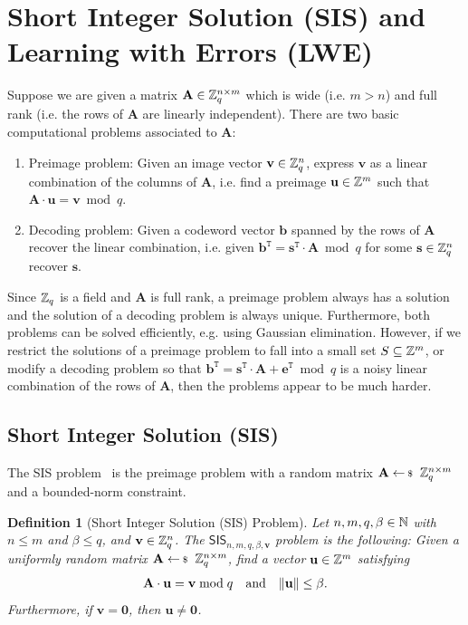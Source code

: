\documentclass[10pt,twoside]{article}
\newtheorem{definition}[theorem]{Definition}
\renewcommand{\vec}[1]{\mathbf{#1}}
\newcommand{\mat}[1]{\mathbf{#1}}
\newcommand{\transpose}{\mathtt{T}}
\newcommand{\SIS}{\mathsf{SIS}}
\begin{document}
\section{Short Integer Solution (SIS) and Learning with Errors (LWE)}

Suppose we are given a matrix $\mat{A} \in \ZZ_q^{n \times m}$ which is wide (i.e. $m > n$) and full rank (i.e. the rows of $\mat{A}$ are linearly independent).
There are two basic computational problems associated to $\mat{A}$:
\begin{enumerate}
    \item Preimage problem: Given an image vector $\vec{v} \in \ZZ_q^n$, express $\vec{v}$ as a linear combination of the columns of $\mat{A}$, i.e. find a preimage $\vec{u} \in \ZZ^m$ such that $\mat{A} \cdot \vec{u} = \vec{v} \bmod q$.
    \item Decoding problem: Given a codeword vector $\vec{b}$ spanned by the rows of $\mat{A}$ recover the linear combination, i.e. given $\vec{b}^\transpose = \vec{s}^\transpose \cdot \mat{A} \bmod q$ for some $\vec{s} \in \ZZ_q^n$ recover $\vec{s}$.
\end{enumerate}
Since $\mathbb{Z}_q$ is a field and $\mat{A}$ is full rank, a preimage problem always has a solution and the solution of a decoding problem is always unique.
Furthermore, both problems can be solved efficiently, e.g. using Gaussian elimination.
However, if we restrict the solutions of a preimage problem to fall into a small set $S \subseteq \mathbb{Z}^m$, or modify a decoding problem so that $\vec{b}^\transpose = \vec{s}^\transpose \cdot \mat{A} + \vec{e}^\transpose \bmod q$ is a noisy linear combination of the rows of $\mat{A}$, then the problems appear to be much harder.

\subsection{Short Integer Solution (SIS)}

The SIS problem~\cite{STOC:Ajtai96} is the preimage problem with a random matrix $\mat{A} \sample \ZZ_q^{n \times m}$ and a bounded-norm constraint.

\begin{definition}[Short Integer Solution (SIS) Problem]
    Let $n,m,q,\beta \in \mathbb{N}$ with $n \leq m$ and $\beta \leq q$, and $\vec{v} \in \ZZ_q^n$.
    The $\SIS_{n,m,q,\beta,\vec{v}}$ problem is the following:
    Given a uniformly random matrix $\mat{A} \sample \ZZ_q^{n \times m}$, find a vector $\vec{u} \in \ZZ^m$ satisfying
    \begin{align*}
        \mat{A} \cdot \vec{u} = \vec{v} \bmod q && \text{and} && \norm{\vec{u}} \leq \beta.
    \end{align*}
    Furthermore, if $\vec{v} = \vec{0}$, then $\vec{u} \neq \vec{0}$.
\end{definition}
\end{document}
